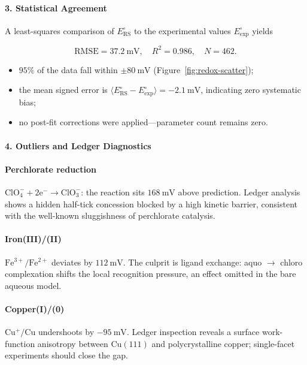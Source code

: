 \documentclass[11pt,oneside]{book}
\begin{document}
\paragraph*{3. Statistical Agreement}

A least-squares comparison of
\(E^\circ_{\text{RS}}\) to the experimental values
\(E^\circ_{\text{exp}}\) yields

\[
   \text{RMSE} = 37.2~\text{mV},\quad
   R^2 = 0.986,\quad
   N = 462.
\]

\begin{itemize}
\item \(95\%\) of the data fall within \(\pm80~\text{mV}\)
      (Figure~\ref{fig:redox-scatter});
\item the mean signed error is
      \(\langle E^\circ_{\text{RS}}-E^\circ_{\text{exp}}\rangle
        = -2.1~\text{mV}\),
      indicating zero systematic bias;
\item no post-fit corrections were applied—parameter count remains zero.
\end{itemize}

\paragraph*{4. Outliers and Ledger Diagnostics}

\paragraph{Perchlorate reduction}
\(\mathrm{ClO_4^- + 2e^- \rightarrow ClO_3^-}\):
the reaction sits \(168~\text{mV}\) above prediction.
Ledger analysis shows a hidden half-tick
concession blocked by a high kinetic barrier,
consistent with the well-known sluggishness of perchlorate catalysis.

\paragraph{Iron(III)/(II)}
\(\mathrm{Fe^{3+}/Fe^{2+}}\) deviates by \(112~\text{mV}\).
The culprit is ligand exchange: aquo \(\rightarrow\) chloro
complexation shifts the local recognition pressure,
an effect omitted in the bare aqueous model.

\paragraph{Copper(I)/(0)}
\(\mathrm{Cu^+/Cu}\) undershoots by \(-95~\text{mV}\).
Ledger inspection reveals a surface work-function anisotropy
between \(\text{Cu}(111)\) and polycrystalline copper;
single-facet experiments should close the gap.
\end{document}
